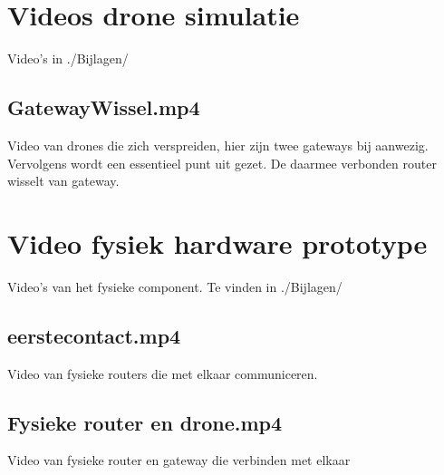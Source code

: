 \documentclass[a4paper, 11pt, oneside]{report}
\begin{document}
\chapter{Videos drone simulatie}\label{sec:videos-drone-simulatie}
Video's in ./Bijlagen/
\section{GatewayWissel.mp4}\label{sec:gatewaywisselmp4}
Video van drones die zich verspreiden, hier zijn twee gateways bij aanwezig.
Vervolgens wordt een essentieel punt uit gezet. 
De daarmee verbonden router wisselt van gateway. 

\chapter{Video fysiek hardware prototype}
Video's van het fysieke component.
Te vinden in ./Bijlagen/
\section{eerstecontact.mp4}\label{sec:eerstecontactmp4}
Video van fysieke routers die met elkaar communiceren.
\section{Fysieke router en drone.mp4}\label{sec:fysieke-router-en-dronemp4}
Video van fysieke router en gateway die verbinden met elkaar
\end{document}
